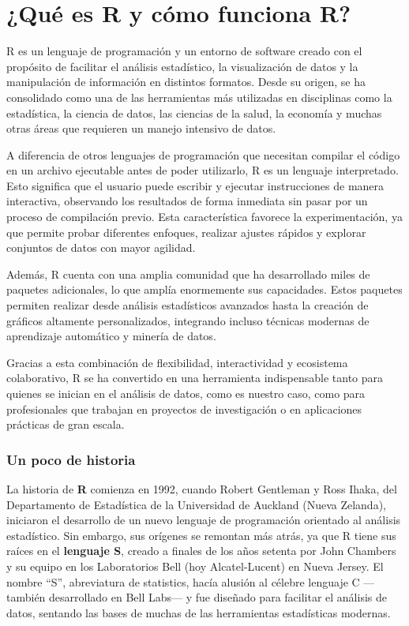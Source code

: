 \documentclass[
  letterpaper,
]{scrbook}
\begin{document}
\hypertarget{quuxe9-es-r-y-cuxf3mo-funciona-r}{%
\chapter{¿Qué es R y cómo funciona
R?}\label{quuxe9-es-r-y-cuxf3mo-funciona-r}}

R es un lenguaje de programación y un entorno de software creado con el
propósito de facilitar el análisis estadístico, la visualización de
datos y la manipulación de información en distintos formatos. Desde su
origen, se ha consolidado como una de las herramientas más utilizadas en
disciplinas como la estadística, la ciencia de datos, las ciencias de la
salud, la economía y muchas otras áreas que requieren un manejo
intensivo de datos.

A diferencia de otros lenguajes de programación que necesitan compilar
el código en un archivo ejecutable antes de poder utilizarlo, R es un
lenguaje interpretado. Esto significa que el usuario puede escribir y
ejecutar instrucciones de manera interactiva, observando los resultados
de forma inmediata sin pasar por un proceso de compilación previo. Esta
característica favorece la experimentación, ya que permite probar
diferentes enfoques, realizar ajustes rápidos y explorar conjuntos de
datos con mayor agilidad.

Además, R cuenta con una amplia comunidad que ha desarrollado miles de
paquetes adicionales, lo que amplía enormemente sus capacidades. Estos
paquetes permiten realizar desde análisis estadísticos avanzados hasta
la creación de gráficos altamente personalizados, integrando incluso
técnicas modernas de aprendizaje automático y minería de datos.

Gracias a esta combinación de flexibilidad, interactividad y ecosistema
colaborativo, R se ha convertido en una herramienta indispensable tanto
para quienes se inician en el análisis de datos, como es nuestro caso,
como para profesionales que trabajan en proyectos de investigación o en
aplicaciones prácticas de gran escala.

\hypertarget{un-poco-de-historia}{%
\subsection{Un poco de historia}\label{un-poco-de-historia}}

La historia de \textbf{R} comienza en 1992, cuando Robert Gentleman y
Ross Ihaka, del Departamento de Estadística de la Universidad de
Auckland (Nueva Zelanda), iniciaron el desarrollo de un nuevo lenguaje
de programación orientado al análisis estadístico. Sin embargo, sus
orígenes se remontan más atrás, ya que R tiene sus raíces en el
\textbf{lenguaje S}, creado a finales de los años setenta por John
Chambers y su equipo en los Laboratorios Bell (hoy Alcatel-Lucent) en
Nueva Jersey. El nombre ``S'', abreviatura de statistics, hacía alusión
al célebre lenguaje C ---también desarrollado en Bell Labs--- y fue
diseñado para facilitar el análisis de datos, sentando las bases de
muchas de las herramientas estadísticas modernas.
\end{document}
